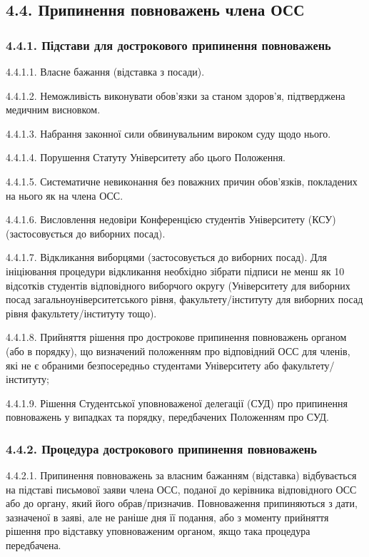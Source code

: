 \subsection*{4.4. Припинення повноважень члена ОСС}
    \subsubsection*{4.4.1. Підстави для дострокового припинення повноважень}
        4.4.1.1. Власне бажання (відставка з посади).

        4.4.1.2. Неможливість виконувати обов'язки за станом здоров'я, підтверджена медичним висновком.

        4.4.1.3. Набрання законної сили обвинувальним вироком суду щодо нього.

        4.4.1.4. Порушення Статуту Університету або цього Положення.

        4.4.1.5. Систематичне невиконання без поважних причин обов'язків, покладених на нього як на члена ОСС.

        4.4.1.6. Висловлення недовіри Конференцією студентів Університету (КСУ) (застосовується до виборних посад).

        4.4.1.7. Відкликання виборцями (застосовується до виборних посад). Для ініціювання процедури відкликання необхідно зібрати підписи не менш як 10 відсотків студентів відповідного виборчого округу (Університету для виборних посад загальноуніверситетського рівня, факультету/інституту для виборних посад рівня факультету/інституту тощо).

        4.4.1.8. Прийняття рішення про дострокове припинення повноважень органом (або в порядку), що визначений положенням про відповідний ОСС для членів, які не є обраними безпосередньо студентами Університету або факультету/інституту;

        4.4.1.9. Рішення Студентської уповноваженої делегації (СУД) про припинення повноважень у випадках та порядку, передбачених Положенням про СУД.

    \subsubsection*{4.4.2. Процедура дострокового припинення повноважень}
        4.4.2.1. Припинення повноважень за власним бажанням (відставка) відбувається на підставі письмової заяви члена ОСС, поданої до керівника відповідного ОСС або до органу, який його обрав/призначив. Повноваження припиняються з дати, зазначеної в заяві, але не раніше дня її подання, або з моменту прийняття рішення про відставку уповноваженим органом, якщо така процедура передбачена.

